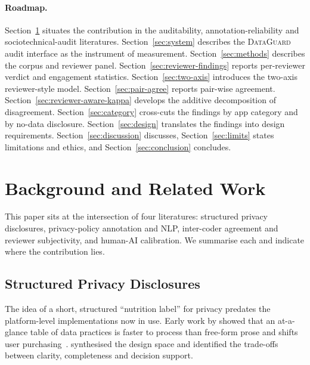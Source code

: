 \documentclass[11pt,a4paper]{article}
\newcommand{\dataguard}{\textsc{DataGuard}}
\begin{document}
\paragraph{Roadmap.}
Section~\ref{sec:related} situates the contribution in the
auditability, annotation-reliability and sociotechnical-audit
literatures. Section~\ref{sec:system} describes the \dataguard{}
audit interface as the instrument of measurement.
Section~\ref{sec:methods} describes the corpus and reviewer panel.
Section~\ref{sec:reviewer-findings} reports per-reviewer verdict and
engagement statistics. Section~\ref{sec:two-axis} introduces the
two-axis reviewer-style model. Section~\ref{sec:pair-agree} reports
pair-wise agreement. Section~\ref{sec:reviewer-aware-kappa} develops
the additive decomposition of disagreement.
Section~\ref{sec:category} cross-cuts the findings by app category
and by no-data disclosure. Section~\ref{sec:design} translates the
findings into design requirements. Section~\ref{sec:discussion}
discusses, Section~\ref{sec:limits} states limitations and ethics,
and Section~\ref{sec:conclusion} concludes.

\section{Background and Related Work}
\label{sec:related}

This paper sits at the intersection of four literatures: structured
privacy disclosures, privacy-policy annotation and NLP, inter-coder
agreement and reviewer subjectivity, and human-AI calibration. We
summarise each and indicate where the contribution lies.

\subsection{Structured Privacy Disclosures}
\label{sec:rel-labels}

The idea of a short, structured ``nutrition label'' for privacy
predates the platform-level implementations now in use. Early
work by \citet{kelley2009nutrition,kelley2010standardizing}
showed that an at-a-glance table of data practices is faster to
process than free-form prose and shifts user
purchasing~\citep{tsai2011effect}. \citet{schaub2015design}
synthesised the design space and identified the trade-offs between
clarity, completeness and decision support.
\end{document}
